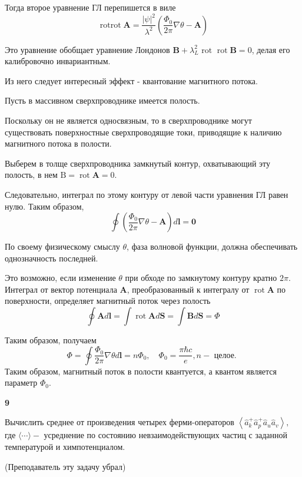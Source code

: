 \documentclass[a4paper,12pt]{article} %
\begin{document}
\begin{task}
Тогда второе уравнение ГЛ перепишется в виле
$$
\operatorname{rotrot} \mathbf{A}
=
\frac{|\psi|^{2}}{\lambda^{2}}
\left(
\frac{\Phi_{0}}{2 \pi} \nabla \theta-\mathbf{A}
\right)
$$


Это уравнение обобщает уравнение Лондонов 
$\mathbf{B}+\lambda_{L}^{2} \text { rot } \operatorname{rot} \mathbf{B}=0$, 
делая его калибровочно инвариантным. 



Из него следует интересный эффект - 
квантование магнитного потока. 



Пусть в массивном сверхпроводнике имеется полость. 


Поскольку он не является односвязным, 
то в сверхпроводнике могут существовать поверхностные сверхпроводящие токи, приводящие к наличию магнитного потока в полости. 

Выберем в толще сверхпроводника замкнутый контур, охватывающий эту полость, в нем $\mathrm{B}= \operatorname{rot} \mathbf{A}=0 .$ 

Следовательно, интеграл по этому контуру от левой части уравнения ГЛ равен нулю. 
Таким образом,
$$
\oint\left(
\frac{\Phi_{0}}{2 \pi} \nabla \theta-\mathbf{A}
\right) d \mathbf{l}
=
\mathbf{0}
$$




По своему физическому смыслу $\theta$, 
фаза волновой функции, 
должна обеспечивать однозначность последней. 

Это возможно, если изменение $\theta$ при обходе по замкнутому контуру кратно $2 \pi$. 
Интеграл от вектор потенциала $ \mathbf{A} $, 
преобразованный к интегралу от $ \operatorname{rot} \mathbf{A} $ по поверхности, 
определяет магнитный поток через полость
$$
\oint \mathbf{A} d \mathbf{l}
=
\int \operatorname{rot} \mathbf{A} d \mathbf{S}
=
\int \mathbf{B} d \mathbf{S}
=
\Phi
$$


Таким образом, получаем
$$
\Phi=
\oint 
\frac{\Phi_{0}}{2 \pi} 
\nabla \theta d \mathbf{l}
=
n \Phi_{0}, 
\quad 
\Phi_{0}=\frac{\pi \hbar c}{e}, n-\text { целое. }
$$
Таким образом, магнитный поток в полости квантуется, 
а квантом является параметр $\Phi_{0}$.








\end{task}





\begin{task} \textbf{9}
	
	
Вычислить среднее от произведения четырех ферми-операторов  
$\left\langle\hat{a}_{k}^{+} \hat{a}_{p}^{+} \hat{a}_{u} \hat{a}_{v}\right\rangle,$ 
где $\langle\cdots\rangle-$ усреднение по состоянию невзаимодействующих частиц с заданной температурой и химпотенциалом.

(Преподаватель эту задачу убрал)










\end{task}
\end{document}
